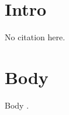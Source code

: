 \documentclass{article}
\begin{document}
\bibliographyunit[\section]
\section{Intro}
No citation here.
\section{Body}
Body \cite{zeta}.
\putbib[nosuchbib]
\end{document}

